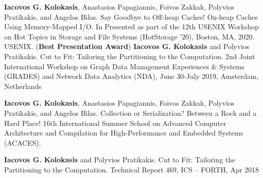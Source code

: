 



\begin{cventries}
\vspace{-15pt}
  \cventry
    {}
    {}
    {}
    {}
    {\textbf{Iacovos G. Kolokasis}, Anastasios Papagiannis, Foivos
    Zakkak, Polyvios Pratikakis, and Angelos Bilas.%
    Say Goodbye to Off-heap Caches! On-heap Caches Using Memory-Mapped
    I/O. In Presented as part of the 12th USENIX Workshop on Hot
    Topics in Storage and File Systems (HotStorage '20), Boston, MA,
    2020. USENIX. (\textbf{Best Presentation Award})}
  {}
  \cventry
    {}
    {}
    {}
    {}
    {\textbf{Iacovos G. Kolokasis} and Polyvios
  Pratikakis. Cut to Fit: Tailoring the Partitioning to the
  Computation. 2nd Joint International Workshop on Graph Data
  Management Experiences \& Systems (GRADES) and Network Data
  Analytics (NDA), June 30-July 2019, Amsterdam, Netherlands}
  {}

\end{cventries}


\vspace{-15pt}
\begin{cventries}

  \cventry
    {}
    {}
    {}
    {}
    {\textbf{Iacovos G. Kolokasis}, Anastasios Papagiannis, Foivos
    Zakkak, Polyvios Pratikakis, and Angelos Bilas.%
    Collection or Serialization? Between a Rock and a Hard Place! 
    16th International Summer School on Advanced Computer Architecture
    and Compilation for High-Performance and Embedded Systems
    (ACACES).}
  {}

\end{cventries}
      

\vspace{-15pt}
\begin{cventries}

  \cventry
    {}
    {}
    {}
    {}
    {\textbf{Iacovos G. Kolokasis} and Polyvios Pratikakis.
      Cut to Fit: Tailoring the Partitioning to the Computation.
      Technical Report 469, ICS -- FORTH, Apr 2018 }{}%


\end{cventries}
